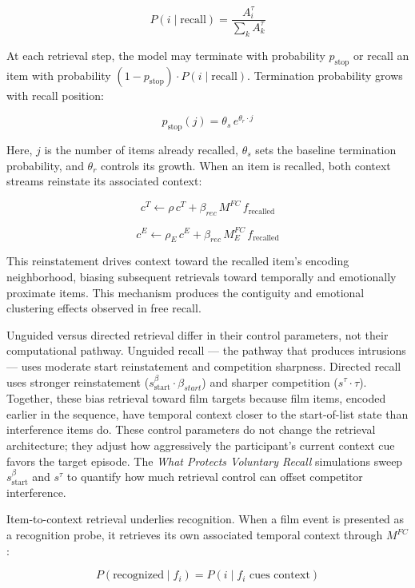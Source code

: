 \documentclass[
  man,
  floatsintext,
  longtable,
  nolmodern,
  notxfonts,
  notimes,
  draftfirst,
  colorlinks=true,linkcolor=blue,citecolor=blue,urlcolor=blue]{apa7}
\begin{document}
\[
P(i \mid \text{recall}) = \frac{A_i^{\tau}}{\sum_k A_k^{\tau}}
\]

At each retrieval step, the model may terminate with probability
\(p_\text{stop}\) or recall an item with probability
\((1 - p_\text{stop}) \cdot P(i \mid \text{recall})\). Termination
probability grows with recall position:

\[
p_\text{stop}(j) = \theta_s \, e^{\theta_r \cdot j}
\]

Here, \(j\) is the number of items already recalled, \(\theta_s\) sets
the baseline termination probability, and \(\theta_r\) controls its
growth. When an item is recalled, both context streams reinstate its
associated context:

\[
c^T \leftarrow \rho \, c^T + \beta_{rec} \, M^{FC} \, f_\text{recalled}
\]

\[
c^E \leftarrow \rho_E \, c^E + \beta_{rec} \, M^{FC}_E \, f_\text{recalled}
\]

This reinstatement drives context toward the recalled item's encoding
neighborhood, biasing subsequent retrievals toward temporally and
emotionally proximate items. This mechanism produces the contiguity and
emotional clustering effects observed in free recall.

Unguided versus directed retrieval differ in their control parameters,
not their computational pathway. Unguided recall --- the pathway that
produces intrusions --- uses moderate start reinstatement and
competition sharpness. Directed recall uses stronger reinstatement
(\(s^{\beta}_\text{start} \cdot \beta_{start}\)) and sharper competition
(\(s^{\tau} \cdot \tau\)). Together, these bias retrieval toward film
targets because film items, encoded earlier in the sequence, have
temporal context closer to the start-of-list state than interference
items do. These control parameters do not change the retrieval
architecture; they adjust how aggressively the participant's current
context cue favors the target episode. The \emph{What Protects Voluntary
Recall} simulations sweep \(s^{\beta}_\text{start}\) and \(s^{\tau}\) to
quantify how much retrieval control can offset competitor interference.

Item-to-context retrieval underlies recognition. When a film event is
presented as a recognition probe, it retrieves its own associated
temporal context through \(M^{FC}\):

\[
P(\text{recognized} \mid f_i) = P(i \mid f_i \text{ cues context})
\]
\end{document}
